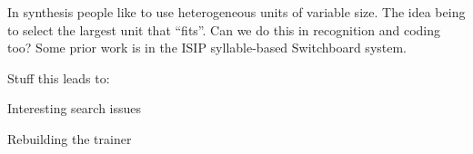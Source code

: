 In synthesis people like to use heterogeneous units of variable size.
The idea being to select the largest unit that ``fits''.  Can we do
this in recognition and coding too?  Some prior work is in the ISIP
syllable-based Switchboard system.

Stuff this leads to:

Interesting search issues

Rebuilding the trainer
